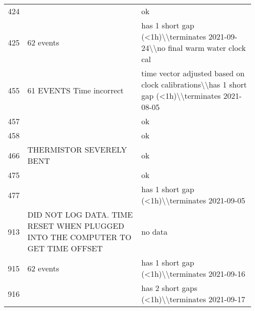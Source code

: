 \begin{longtable}{p{1cm}p{7cm}p{7cm}}
424  &                                                                                 &                                                                                              ok \\
425  &                                                                       62 events &                     has 1 short gap (<1h)\textbackslash \textbackslash terminates 2021-09-24\textbackslash \textbackslash no final warm water clock cal \\
455  &                                                        61 EVENTS Time incorrect &  time vector adjusted based on clock calibrations\textbackslash \textbackslash has 1 short gap (<1h)\textbackslash \textbackslash terminates 2021-08-05 \\
457  &                                                                                 &                                                                                              ok \\
458  &                                                                                 &                                                                                              ok \\
466  &                                                        THERMISTOR SEVERELY BENT &                                                                                              ok \\
475  &                                                                                 &                                                                                              ok \\
477  &                                                                                 &                                                    has 1 short gap (<1h)\textbackslash \textbackslash terminates 2021-09-05 \\
913  &  DID NOT LOG DATA. TIME RESET WHEN PLUGGED INTO THE COMPUTER TO GET TIME OFFSET &                                                                                         no data \\
915  &                                                                       62 events &                                                    has 1 short gap (<1h)\textbackslash \textbackslash terminates 2021-09-16 \\
916  &                                                                                 &                                                   has 2 short gaps (<1h)\textbackslash \textbackslash terminates 2021-09-17 \\

\end{longtable}
